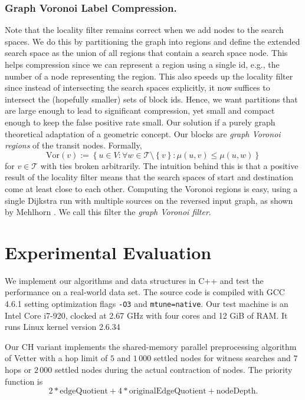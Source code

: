 \documentclass{llncs}
\newcommand{\set}[1]{\left\{ #1\right\}}
\newcommand{\gilt}{:}
\newcommand{\setGilt}[2]{\left\{ #1\gilt #2\right\}}
\newcommand{\Vor}[1]{\mathrm{Vor}(#1)}
\begin{document}
\subsubsection{Graph Voronoi Label Compression.}
Note that the locality filter remains correct when we add nodes to the search spaces. 
We do this by partitioning the graph into regions and define the extended search space as the union of all regions that contain a search space node. 
This helps compression since we can represent a region using a single id, e.g., the number of a node representing the region. 
This also speeds up the locality filter since instead of intersecting the search spaces explicitly, it now suffices to intersect the (hopefully smaller) sets of block ids.  
Hence, we want partitions that are large enough to lead to significant compression, yet small and compact enough to keep the false positive rate small. Our solution if a purely graph theoretical adaptation of a geometric concept.
Our blocks are \emph{graph Voronoi regions} of the transit nodes. Formally, $$\Vor{v}:=\setGilt{u\in V}{\forall   w\in\mathcal{T}\setminus\set{v}\gilt\mu(u,v)\leq \mu(u,w)}$$ for $v\in\mathcal{T}$ with ties broken arbitrarily. The intuition behind this is that a positive result of the locality filter means that the search spaces of start and destination come at least close to each other.
Computing the Voronoi regions is easy, using a single Dijkstra run with multiple sources on the reversed input graph, as shown by Mehlhorn \cite{m-as-88}. 
We call this filter the \emph{graph Voronoi filter}.

\section{Experimental Evaluation}
\label{sec:tnr-experiments}

We implement our algorithms and data structures in C++ and test the performance on a real-world data set.
The source code is compiled with GCC 4.6.1 setting optimization flags \texttt{-O3} and \texttt{mtune=native}.
Our test machine is an Intel Core i7-920, clocked at 2.67 GHz with four cores and 12 GiB of RAM.
It runs Linux kernel version 2.6.34

Our CH variant implements the shared-memory parallel preprocessing algorithm of Vetter \cite{v-ptdch-09} with a hop limit of $5$ and $1\,000$ settled nodes for witness searches and $7$ hops or $2\,000$ settled nodes during the actual contraction of nodes.
The priority function is $$2*\text{edgeQuotient} + 4*\text{originalEdgeQuotient} + \text{nodeDepth}.$$
\end{document}
